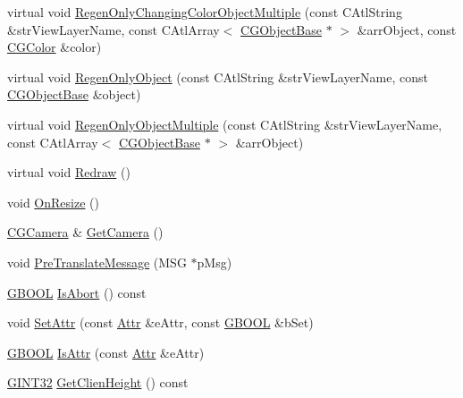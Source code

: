 \begin{DoxyCompactItemize}
\item 
virtual void \hyperlink{class_c_g3_d_view_ab76493432442f14c16fcb44519e74ee9}{Regen\+Only\+Changing\+Color\+Object\+Multiple} (const C\+Atl\+String \&str\+View\+Layer\+Name, const C\+Atl\+Array$<$ \hyperlink{class_c_g_object_base}{C\+G\+Object\+Base} $\ast$ $>$ \&arr\+Object, const \hyperlink{class_c_g_color}{C\+G\+Color} \&color)
\item 
virtual void \hyperlink{class_c_g3_d_view_a37f1356825717a558f79e6ff5e6503b5}{Regen\+Only\+Object} (const C\+Atl\+String \&str\+View\+Layer\+Name, const \hyperlink{class_c_g_object_base}{C\+G\+Object\+Base} \&object)
\item 
virtual void \hyperlink{class_c_g3_d_view_afe9ece9786fd1f5c178ccbd8f94d32bd}{Regen\+Only\+Object\+Multiple} (const C\+Atl\+String \&str\+View\+Layer\+Name, const C\+Atl\+Array$<$ \hyperlink{class_c_g_object_base}{C\+G\+Object\+Base} $\ast$ $>$ \&arr\+Object)
\item 
virtual void \hyperlink{class_c_g3_d_view_ac0f96baa1fed5188b0b9d395c9b0b8a0}{Redraw} ()
\item 
void \hyperlink{class_c_g3_d_view_a192ac299a7123f5c1663e416eb8ddd07}{On\+Resize} ()
\item 
\hyperlink{class_c_g_camera}{C\+G\+Camera} \& \hyperlink{class_c_g3_d_view_aed8e9e4e44f899d422c4aa82e6bae8dd}{Get\+Camera} ()
\item 
void \hyperlink{class_c_g3_d_view_a90b403c7341e001ff61429bf639bf122}{Pre\+Translate\+Message} (M\+S\+G $\ast$p\+Msg)
\item 
\hyperlink{_g_types_8h_a2901915743626352a6820c5405f556dc}{G\+B\+O\+O\+L} \hyperlink{class_c_g3_d_view_a27b61807ea71e1caddec76facb0d9603}{Is\+Abort} () const 
\item 
void \hyperlink{class_c_g3_d_view_ad8bb5814fe509062a9f7b5f26dda72e2}{Set\+Attr} (const \hyperlink{class_c_g3_d_view_ae3a6556009bb00e43baf4d7087921475}{Attr} \&e\+Attr, const \hyperlink{_g_types_8h_a2901915743626352a6820c5405f556dc}{G\+B\+O\+O\+L} \&b\+Set)
\item 
\hyperlink{_g_types_8h_a2901915743626352a6820c5405f556dc}{G\+B\+O\+O\+L} \hyperlink{class_c_g3_d_view_aa6a20de71dccb39196c768ed1debc7b8}{Is\+Attr} (const \hyperlink{class_c_g3_d_view_ae3a6556009bb00e43baf4d7087921475}{Attr} \&e\+Attr)
\item 
\hyperlink{_g_types_8h_a40d8bc7c06b9e72906852691a4bf888e}{G\+I\+N\+T32} \hyperlink{class_c_g3_d_view_acddf70893c90502391eb74644554d9ba}{Get\+Clien\+Height} () const 
\item 

\end{DoxyCompactItemize}
